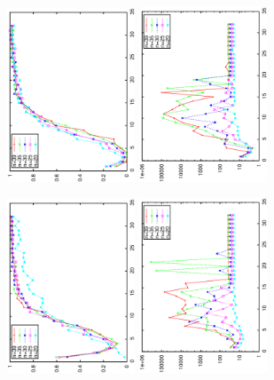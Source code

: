 \documentclass[twoside,11pt]{article}
\begin{document}
\begin{figure}
\centering
\includegraphics[width=0.34\textwidth,angle=-90]{ham_complete_prob_a1.0.ps}
\includegraphics[width=0.34\textwidth,angle=-90]{ham_complete_it_a1.0.ps}


\includegraphics[width=0.34\textwidth,angle=-90]{ham_complete_prob_a1.5.ps}
\includegraphics[width=0.34\textwidth,angle=-90]{ham_complete_it_a1.5.ps}



\end{figure}
\end{document}
